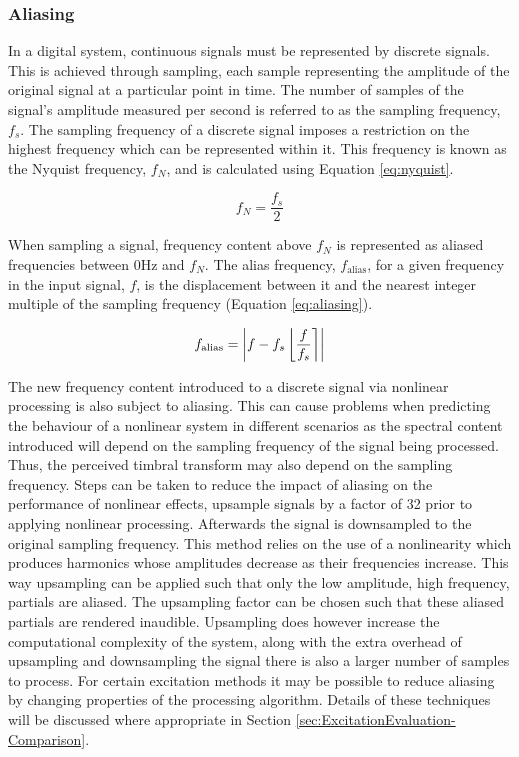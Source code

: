 		\subsubsection*{Aliasing}
			In a digital system, continuous signals must be represented by discrete signals. This is achieved
			through sampling, each sample representing the amplitude of the original signal at a particular
			point in time. The number of samples of the signal's amplitude measured per second is referred to
			as the sampling frequency, $f_{s}$. The sampling frequency of a discrete signal imposes a
			restriction on the highest frequency which can be represented within it. This frequency is known as
			the Nyquist frequency, $f_{N}$, and is calculated using Equation \ref{eq:nyquist}.

			\begin{equation}
				f_{N} = \frac{f_{s}}{2}
				\label{eq:nyquist}
			\end{equation}

			When sampling a signal, frequency content above $f_{N}$ is represented as aliased frequencies
			between 0Hz and $f_{N}$. The alias frequency, $f_{\mathrm{alias}}$, for a given frequency in the
			input signal, $f$, is the displacement between it and the nearest integer multiple of the sampling
			frequency (Equation \ref{eq:aliasing}).

			\begin{equation}
				f_{\mathrm{alias}} = \left|f - f_{s}\left\lfloor\frac{f}{f_{s}}\right\rceil\right|
				\label{eq:aliasing}
			\end{equation}

			The new frequency content introduced to a discrete signal via nonlinear processing is also subject
			to aliasing. This can cause problems when predicting the behaviour of a nonlinear system in
			different scenarios as the spectral content introduced will depend on the sampling frequency of the
			signal being processed. Thus, the perceived timbral transform may also depend on the sampling
			frequency. Steps can be taken to reduce the impact of aliasing on the performance of nonlinear
			effects, \citep{vetter2013estimation} upsample signals by a factor of 32 prior to applying
			nonlinear processing. Afterwards the signal is downsampled to the original sampling frequency. This
			method relies on the use of a nonlinearity which produces harmonics whose amplitudes decrease as
			their frequencies increase. This way upsampling can be applied such that only the low amplitude,
			high frequency, partials are aliased. The upsampling factor can be chosen such that these aliased
			partials are rendered inaudible. Upsampling does however increase the computational complexity of
			the system, along with the extra overhead of upsampling and downsampling the signal there is also a
			larger number of samples to process. For certain excitation methods it may be possible to reduce
			aliasing by changing properties of the processing algorithm. Details of these techniques will be
			discussed where appropriate in Section \ref{sec:ExcitationEvaluation-Comparison}.

